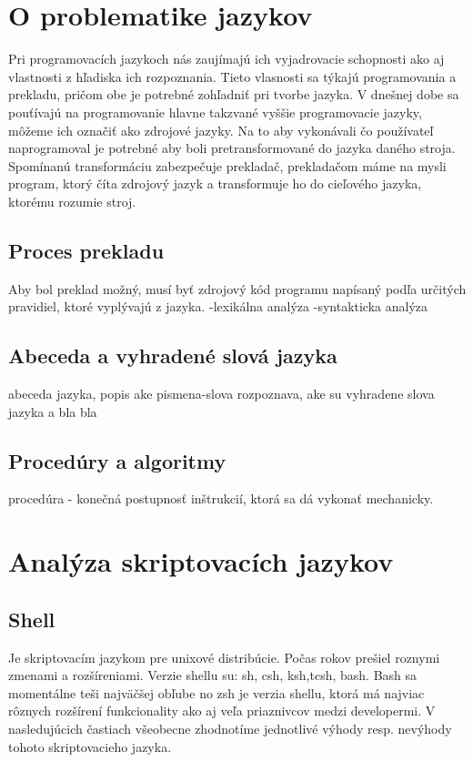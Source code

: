 \section{O problematike jazykov}
\indent Pri programovacích jazykoch nás zaujímajú ich vyjadrovacie schopnosti ako aj vlastnosti z hľadiska ich rozpoznania. Tieto vlasnosti sa týkajú programovania a prekladu, pričom obe je potrebné zohľadniť pri tvorbe jazyka. V dnešnej dobe sa pouťívajú na programovanie hlavne takzvané vyššie programovacie jazyky, môžeme ich označiť ako zdrojové jazyky. Na to aby vykonávali čo používateľ naprogramoval je potrebné aby boli pretransformované do jazyka daného stroja. Spomínanú transformáciu zabezpečuje prekladač, prekladačom máme na mysli program, ktorý číta zdrojový jazyk a transformuje ho do cieľového jazyka, ktorému rozumie stroj.

\subsection{Proces prekladu}
Aby bol preklad možný, musí byť zdrojový kód programu napísaný podľa určitých pravidiel, ktoré vyplývajú z jazyka.
-lexikálna analýza
-syntakticka analýza

\subsection{Abeceda a vyhradené slová jazyka}
abeceda jazyka, popis ake pismena-slova rozpoznava, ake su vyhradene slova jazyka a bla bla


\subsection{Procedúry a algoritmy}
procedúra - konečná postupnosť inštrukcií, ktorá sa dá vykonať mechanicky.

\section{Analýza skriptovacích jazykov}

\subsection{Shell}
\indent
Je skriptovacím jazykom pre unixové distribúcie. Počas rokov prešiel roznymi zmenami a rozšíreniami. Verzie shellu su: sh, csh, ksh,tcsh, bash. Bash sa momentálne teši najväčšej obľube no zsh je verzia shellu, ktorá má najviac rôznych rozšírení funkcionality ako aj veľa priaznivcov medzi developermi. V nasledujúcich častiach všeobecne zhodnotíme jednotlivé výhody resp. nevýhody tohoto skriptovacieho jazyka.

